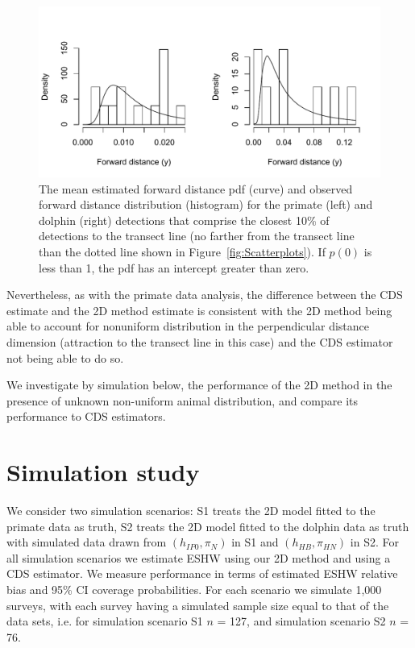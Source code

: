 \documentclass[useAMS,usenatbib,referee]{biom}
\begin{document}
\begin{figure}
\caption{The mean estimated forward distance pdf (curve) and observed forward distance distribution (histogram) for the primate (left) and dolphin (right) detections that comprise the closest 10\% of detections to the transect line (no farther from the transect line than the dotted line shown in Figure~\ref{fig:Scatterplots}). If $p(0)$ is less than 1, the pdf has an intercept greater than zero. \label{fig:fy_x0fits}}
\includegraphics[scale=1]{fy_x0fits.pdf}
\end{figure}

Nevertheless, as with the primate data analysis, the difference between the CDS estimate and the 2D method estimate is consistent with the 2D method being able to account for nonuniform distribution in the perpendicular distance dimension (attraction to the transect line in this case) and the CDS estimator not being able to do so.

We investigate by simulation below, the performance of the 2D method in the presence of unknown non-uniform animal distribution, and compare its performance to CDS estimators.


\section{Simulation study}

We consider two simulation scenarios: S1 treats the 2D model fitted to the primate data as truth, S2 treats the 2D model fitted to the dolphin data as truth with simulated data drawn from  $(h_{IP0},\pi_{N})$ in S1 and $(h_{HB},\pi_{HN})$ in S2. For all simulation scenarios we estimate ESHW using our 2D method and using a CDS estimator. We measure performance in terms of estimated ESHW relative bias and 95\% CI coverage probabilities. For each scenario we simulate 1,000 surveys, with each survey having a simulated sample size equal to that of the data sets, i.e. for simulation scenario S1 $n$ = 127, and simulation scenario S2 $n$ = 76. 
\end{document}
